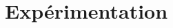 \chapter{Expérimentation}
\label{sec:experimenting}
\thispagestyle{fancy}

\lipsum

\clearemptydoublepage

